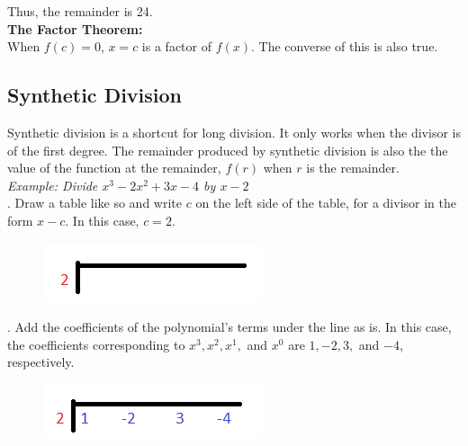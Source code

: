         \noindent Thus, the remainder is 24. \\
        \noindent \color{purple} \textbf{The Factor Theorem:} \color{black} \\
        When $f(c)=0$, $x=c$ is a factor of $f(x)$. The converse of this is also true.



    \subsection{Synthetic Division}
        Synthetic division is a shortcut for long division. It only works when the divisor is
        of the first degree. The remainder produced by synthetic division is also the the value
        of the function at the remainder, $f(r)$ when $r$ is the remainder. \\

        \noindent \color{blue} \textit{Example: Divide $x^3-2x^2+3x-4$ by $x-2$} \color{black} \\

        . Draw a table like so and write $c$ on the left side of the table, for a
        divisor in the form $x-c$. In this case, $c=2$. \\

        \begin{figure} [hbt!]
            \centering
            \includegraphics [scale = 0.5] {Resources/Unit3Polynomials/synthdiv1.png}
        \end{figure}

        . Add the coefficients of the polynomial's terms under the line as is. In
        this case, the coefficients corresponding to $x^3, x^2, x^1,$ and $x^0$ are $1,-2,3,$
        and $-4$, respectively. \\

        \begin{figure} [hbt!]
            \centering
            \includegraphics [scale = 0.5] {Resources/Unit3Polynomials/synthdiv2.png}
        \end{figure}

